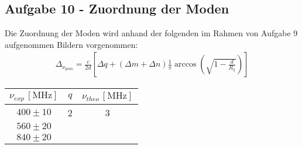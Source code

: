 \subsection{Aufgabe 10 - Zuordnung der Moden}
Die Zuordnung der Moden wird anhand der folgenden im Rahmen von Aufgabe 9 aufgenommen Bildern vorgenommen:
\begin{align}
\Delta_\nu_{qmn} = 
\frac{c}{2d}\left[ \Delta q + (\Delta m + \Delta n) \frac{1}{\pi} \arccos \left(\sqrt{1-\frac{d}{R_2}} \right)  \right]
\end{align}
\begin{center}
\begin{tabular}{c|c|c}
$\nu_{exp}\,[\text{MHz}]$ & $q$ & $\nu_{theo}\,[\text{MHz}]$ \\\hline
$400 \pm 10$ & 2 & 3 \\
$560 \pm 20$ & & \\
$840 \pm 20$ & & 
\end{tabular}
\end{center}
